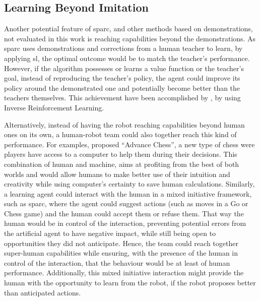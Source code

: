 \subsection{Learning Beyond Imitation}\label{sec:disc_beyond}

Another potential feature of \gls{sparc}, and other methods based on demonstrations, not evaluated in this work is reaching capabilities beyond the demonstrations. As \gls{sparc} uses demonstrations and corrections from a human teacher to learn, by applying \gls{sl}, the optimal outcome would be to match the teacher's performance. However, if the algorithm possesses or learns a value function or the teacher's goal, instead of reproducing the teacher's policy, the agent could improve its policy around the demonstrated one and potentially become better than the teachers themselves. This achievement have been accomplished by \cite{abbeel2004apprenticeship}, by using Inverse Reinforcement Learning. 

Alternatively, instead of having the robot reaching capabilities beyond human ones on its own, a human-robot team could also together reach this kind of performance. For examples, \cite{kasparov2010chess} proposed ``Advance Chess'', a new type of chess were players have access to a computer to help them during their decisions. This combination of human and machine, aims at profiting from the best of both worlds and would allow humans to make better use of their intuition and creativity while using computer's certainty to save human calculations. Similarly, a learning agent could interact with the human in a mixed initiative framework, such as \gls{sparc}, where the agent could suggest actions (such as moves in a Go or Chess game) and the human could accept them or refuse them. That way the human would be in control of the interaction, preventing potential errors from the artificial agent to have negative impact, while still being open to opportunities they did not anticipate. Hence, the team could reach together super-human capabilities while ensuring, with the presence of the human in control of the interaction, that the behaviour would be at least of human performance. Additionally, this mixed initiative interaction might provide the human with the opportunity to learn from the robot, if the robot proposes better than anticipated actions.

